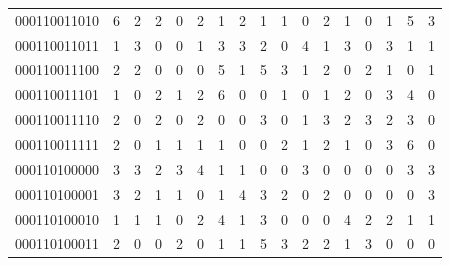 \documentclass[10pt,a4paper]{article}
\begin{document}
\begin{longtable}{ |c|c|c|c|c|c|c|c|c|c|c|c|c|c|c|c|c| }
    000110011010              & 6                            & 2                                & 2                            & 0                              & 2   & 1   & 2   & 1   & 1   & 0   & 2   & 1   & 0   & 1   & 5   & 3   \\
    000110011011              & 1                            & 3                                & 0                            & 0                              & 1   & 3   & 3   & 2   & 0   & 4   & 1   & 3   & 0   & 3   & 1   & 1   \\
    000110011100              & 2                            & 2                                & 0                            & 0                              & 0   & 5   & 1   & 5   & 3   & 1   & 2   & 0   & 2   & 1   & 0   & 1   \\
    000110011101              & 1                            & 0                                & 2                            & 1                              & 2   & 6   & 0   & 0   & 1   & 0   & 1   & 2   & 0   & 3   & 4   & 0   \\
    000110011110              & 2                            & 0                                & 2                            & 0                              & 2   & 0   & 0   & 3   & 0   & 1   & 3   & 2   & 3   & 2   & 3   & 0   \\
    000110011111              & 2                            & 0                                & 1                            & 1                              & 1   & 1   & 0   & 0   & 2   & 1   & 2   & 1   & 0   & 3   & 6   & 0   \\
    000110100000              & 3                            & 3                                & 2                            & 3                              & 4   & 1   & 1   & 0   & 0   & 3   & 0   & 0   & 0   & 0   & 3   & 3   \\
    000110100001              & 3                            & 2                                & 1                            & 1                              & 0   & 1   & 4   & 3   & 2   & 0   & 2   & 0   & 0   & 0   & 0   & 3   \\
    000110100010              & 1                            & 1                                & 1                            & 0                              & 2   & 4   & 1   & 3   & 0   & 0   & 0   & 4   & 2   & 2   & 1   & 1   \\
    000110100011              & 2                            & 0                                & 0                            & 2                              & 0   & 1   & 1   & 5   & 3   & 2   & 2   & 1   & 3   & 0   & 0   & 0   \\

\end{longtable}
\end{document}
